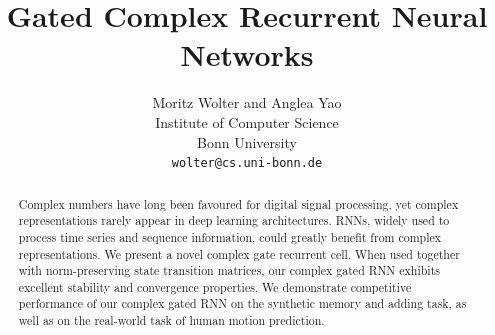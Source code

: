 \documentclass{article}
\title{Gated Complex Recurrent Neural Networks}
\author{
  Moritz Wolter and Anglea Yao \\%
  Institute of Computer Science\\
  Bonn University\\
  \texttt{wolter@cs.uni-bonn.de} \\
}
\begin{document}

\maketitle

\begin{abstract}
Complex numbers have long been favoured for digital signal processing, yet complex representations rarely appear in deep learning architectures.  RNNs, widely used to process time series and sequence information, could greatly benefit from complex representations.  We present a novel complex gate recurrent cell.  When used together with norm-preserving state transition matrices, our complex gated RNN exhibits excellent stability and convergence properties.  We demonstrate competitive performance of our complex gated RNN on the synthetic memory and adding task, as well as on the real-world task of human motion prediction.
\end{abstract}

\end{document}
